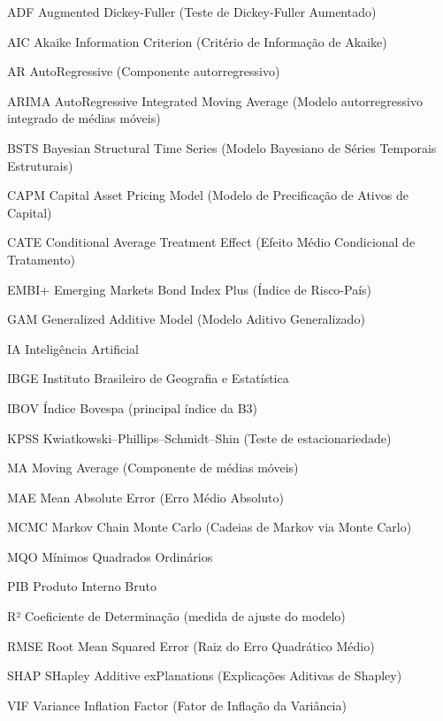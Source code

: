 \documentclass[	12pt, Times, openright, oneside, a4paper, english, brazil]{abntex2}
\begin{document}
\begin{siglas}
    \item [ADF] Augmented Dickey-Fuller (Teste de Dickey-Fuller Aumentado)
    \item [AIC] Akaike Information Criterion (Critério de Informação de Akaike)
    \item [AR] AutoRegressive (Componente autorregressivo)
    \item [ARIMA] AutoRegressive Integrated Moving Average (Modelo autorregressivo integrado de médias móveis)
    \item [BSTS] Bayesian Structural Time Series (Modelo Bayesiano de Séries Temporais Estruturais)
    \item [CAPM] Capital Asset Pricing Model (Modelo de Precificação de Ativos de Capital)
    \item [CATE] Conditional Average Treatment Effect (Efeito Médio Condicional de Tratamento)
    \item [EMBI+] Emerging Markets Bond Index Plus (Índice de Risco-País)
    \item [GAM] Generalized Additive Model (Modelo Aditivo Generalizado)
    \item [IA] Inteligência Artificial
    \item [IBGE] Instituto Brasileiro de Geografia e Estatística
    \item [IBOV] Índice Bovespa (principal índice da B3)
    \item [KPSS] Kwiatkowski–Phillips–Schmidt–Shin (Teste de estacionariedade)
    \item [MA] Moving Average (Componente de médias móveis)
    \item [MAE] Mean Absolute Error (Erro Médio Absoluto)
    \item [MCMC] Markov Chain Monte Carlo (Cadeias de Markov via Monte Carlo)
    \item [MQO] Mínimos Quadrados Ordinários
    \item [PIB] Produto Interno Bruto
    \item [R²] Coeficiente de Determinação (medida de ajuste do modelo)
    \item [RMSE] Root Mean Squared Error (Raiz do Erro Quadrático Médio)
    \item [SHAP] SHapley Additive exPlanations (Explicações Aditivas de Shapley)
    \item [VIF] Variance Inflation Factor (Fator de Inflação da Variância)
\end{siglas}
\end{document}
